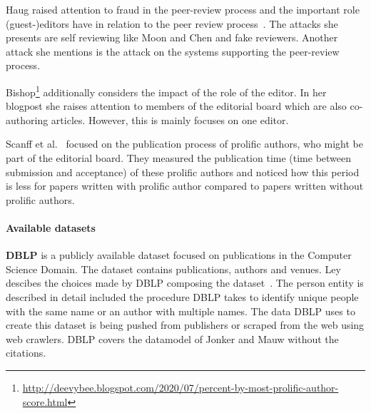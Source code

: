 \documentclass{ou-report}
\newcommand{\todo}[1]{{\color{red} TODO: #1}}
\newcommand{\dblp}{DBLP}
\begin{document}
Haug raised attention to fraud in the peer-review process and the important role
(guest-)editors have in relation to the peer review process~\cite{Haug2015}. The 
attacks she presents are self reviewing like Moon and Chen and fake reviewers.
Another attack she mentions is the attack on the systems supporting the peer-review
process.

Bishop\footnote{\url{http://deevybee.blogspot.com/2020/07/percent-by-most-prolific-author-score.html}}
additionally considers the impact of the role of the editor.
In her blogpost she raises attention to members of the editorial board which are
also co-authoring articles. However, this is mainly focuses on one editor.

Scanff et al.~\cite{SNCMBL2021} focused on the publication process of prolific
authors, who might be part of the editorial board. They measured the
publication time (time between submission and acceptance) of these prolific
authors and noticed how this period is less for papers written with prolific
author compared to papers written without prolific authors. 


\paragraph{Available datasets}


\textbf{\dblp{}} is a publicly available dataset focused on publications in the
Computer Science Domain. The dataset contains publications, authors and venues.
Ley descibes the choices made by \dblp{} composing the
dataset~\cite{DBLP:journals/pvldb/Ley09}. The person entity is described in 
detail included the procedure DBLP takes to identify unique people with the same
name or an author with multiple names.
The data \dblp{} uses to create this dataset is being pushed from publishers or 
scraped from the web using web crawlers. \dblp{} covers the datamodel of Jonker
and Mauw without the citations.
\end{document}
